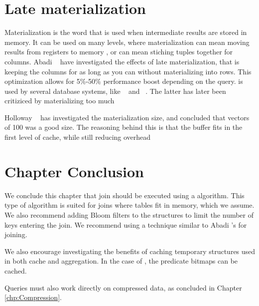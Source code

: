 \section{Late materialization}
\label{sec:Late materialization}
Materialization is the word that is used when intermediate results are stored in memory. It can be used on many levels, where materialization can mean moving results from registers to memory \cite{Neumann2011-uq}, or can mean stiching tuples together for columns. Abadi \ea~\cite{Abadi2008-dd} have investigated the effects of late materialization, that is keeping the columns for as long as you can without materializing into rows. This optimization allows for 5\%-50\% performance boost depending on the query.  is used by several database systems, like \ibm~\cite{Raman2013-em} and \monetdb~\cite{Boncz2002-yj}. The latter has later been critiziced by materializing too much \cite{Boncz2005-wj}

Holloway \ea~\cite{Holloway2008-rr} has investigated the materialization size, and concluded that vectors of 100 was a good size. The reasoning behind this is that the buffer fits in the first level of cache, while still reducing overhead
\section{Chapter Conclusion}
\label{sec:Chapter Conclusion}
We conclude this chapter that join should be executed using a  algorithm. This type of algorithm is suited for joins where tables fit in memory, which we assume. We also recommend adding Bloom filters to the structures to limit the number of keys entering the join. We recommend using a technique similar to Abadi \ea's  for joining.

We also encourage investigating the benefits of caching temporary structures used in both cache and aggregation. In the case of , the predicate bitmaps can be cached.

Queries must also work directly on compressed data, as concluded in Chapter \ref{chp:Compression}.
